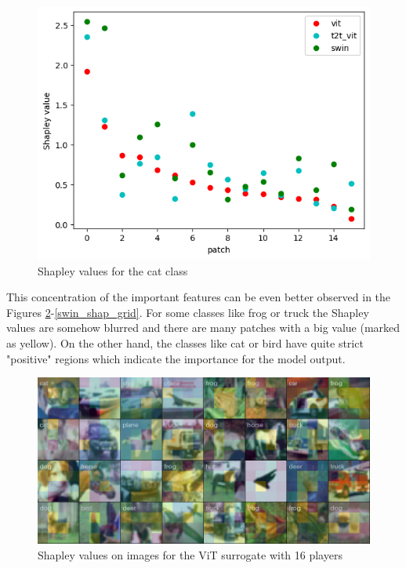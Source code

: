 \documentclass[magisterska,en]{pracamgr}
\begin{document}
\begin{figure}[H]
\centering
\includegraphics[scale=0.5]{./images/Cat_shapley.png}
\caption{Shapley values for the cat class}
\label{Cat_shapley}
\end{figure}





This concentration of the important features can be even better observed in the Figures \ref{vit_shap_grid}-\ref{swin_shap_grid}. For some classes like frog or truck the Shapley values are somehow blurred and there are many patches with a big value (marked as yellow). On the other hand, the classes like cat or bird have quite strict "positive" regions which indicate the importance for the model output.



\pagebreak

\begin{figure}[H]
\centering
\includegraphics[scale=0.4]{./images/vit_shap_grid.png}
\caption{Shapley values on images for the ViT surrogate with 16 players}
\label{vit_shap_grid}
\end{figure}
\end{document}
